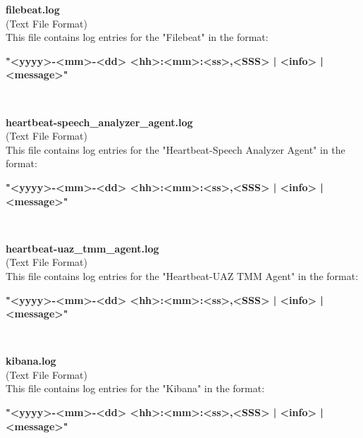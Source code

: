 \begin{description}
\begin{addmargin}[0em]{0em}
    \label{filebeat.log}
    \begin{addmargin}[1em]{0em} %
        \textbf{filebeat.log}\\
        (Text File Format)\\
        This file contains log entries for the "Filebeat" in the format:
        \begin{addmargin}[1em]{0em}
            \textbf{"<yyyy>-<mm>-<dd> <hh>:<mm>:<ss>,<SSS> | <info> | <message>"}
        \end{addmargin}
    \end{addmargin} %
    \textbf{\\}

    \label{heartbeat-speech_analyzer_agent.log}
    \begin{addmargin}[1em]{0em} %
        \textbf{heartbeat-speech\_analyzer\_agent.log}\\
        (Text File Format)\\
        This file contains log entries for the "Heartbeat-Speech Analyzer Agent" in the format:
        \begin{addmargin}[1em]{0em}
            \textbf{"<yyyy>-<mm>-<dd> <hh>:<mm>:<ss>,<SSS> | <info> | <message>"}
        \end{addmargin}
    \end{addmargin} %
    \textbf{\\}

    \label{heartbeat-uaz_tmm_agent.log}
    \begin{addmargin}[1em]{0em} %
        \textbf{heartbeat-uaz\_tmm\_agent.log}\\
        (Text File Format)\\
        This file contains log entries for the "Heartbeat-UAZ TMM Agent" in the format:
        \begin{addmargin}[1em]{0em}
            \textbf{"<yyyy>-<mm>-<dd> <hh>:<mm>:<ss>,<SSS> | <info> | <message>"}
        \end{addmargin}
    \end{addmargin} %
    \textbf{\\}

    \label{kibana.log}
    \begin{addmargin}[1em]{0em} %
        \textbf{kibana.log}\\
        (Text File Format)\\
        This file contains log entries for the "Kibana" in the format:
        \begin{addmargin}[1em]{0em}
            \textbf{"<yyyy>-<mm>-<dd> <hh>:<mm>:<ss>,<SSS> | <info> | <message>"}
        \end{addmargin}
    \end{addmargin} %
    \textbf{\\}


\end{addmargin}
\end{description}
